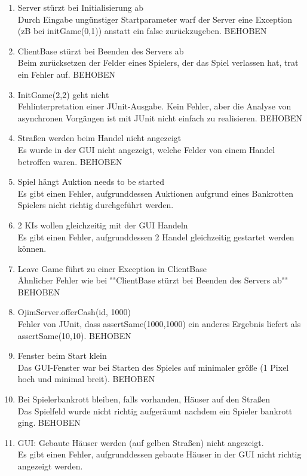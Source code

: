 \documentclass[a4paper,10pt]{article}
\begin{document}
\begin{enumerate}
\item Server stürzt bei Initialisierung ab
\\Durch Eingabe ungünstiger Startparameter warf der Server eine Exception (zB bei initGame(0,1)) anstatt ein false zurückzugeben. BEHOBEN
\item ClientBase stürzt bei Beenden des Servers ab
\\Beim zurücksetzen der Felder eines Spielers, der das Spiel verlassen hat, trat ein Fehler auf. BEHOBEN
\item InitGame(2,2) geht nicht
\\Fehlinterpretation einer JUnit-Ausgabe. Kein Fehler, aber die Analyse von asynchronen Vorgängen ist mit JUnit nicht einfach zu realisieren. BEHOBEN
\item Straßen werden beim Handel nicht angezeigt
\\Es wurde in der GUI nicht angezeigt, welche Felder von einem Handel betroffen waren. BEHOBEN
\item Spiel hängt Auktion needs to be started
\\Es gibt einen Fehler, aufgrunddessen Auktionen aufgrund eines Bankrotten Spielers nicht richtig durchgeführt werden.
\item 2 KIs wollen gleichzeitig mit der GUI Handeln
\\Es gibt einen Fehler, aufgrunddessen 2 Handel gleichzeitig gestartet werden können.
\item Leave Game führt zu einer Exception in ClientBase
\\Ähnlicher Fehler wie bei ""ClientBase stürzt bei Beenden des Servers ab"" BEHOBEN
\item OjimServer.offerCash(id, 1000)
\\Fehler von JUnit, dass assertSame(1000,1000) ein anderes Ergebnis liefert als assertSame(10,10). BEHOBEN
\item Fenster beim Start klein
\\Das GUI-Fenster war bei Starten des Spieles auf minimaler größe (1 Pixel hoch und minimal breit). BEHOBEN
\item Bei Spielerbankrott bleiben, falls vorhanden, Häuser auf den Straßen
\\Das Spielfeld wurde nicht richtig aufgeräumt nachdem ein Spieler bankrott ging. BEHOBEN
\item GUI: Gebaute Häuser werden (auf gelben Straßen) nicht angezeigt.
\\Es gibt einen Fehler, aufgrunddessen gebaute Häuser in der GUI nicht richtig angezeigt werden.

\end{enumerate}
\end{document}

